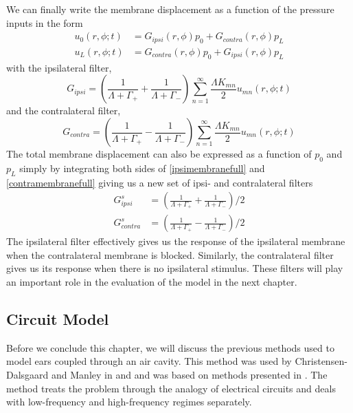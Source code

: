 We can finally write the membrane displacement as a function of the pressure inputs in the form
\begin{align}
 u_0(r,\phi;t)&=G_{ipsi}(r,\phi)p_0+G_{contra}(r,\phi)p_L\label{ipsimembranefull}\\
 u_L(r,\phi;t)&=G_{contra}(r,\phi)p_0+G_{ipsi}(r,\phi)p_L\label{contramembranefull}
\end{align}
with the ipsilateral filter,
\begin{equation}
 G_{ipsi}=\left(\frac{1}{\Lambda+\Gamma_+}+\frac{1}{\Lambda+\Gamma_-}\right)\displaystyle\sum^\infty_{n=1}\frac{\Lambda K_{mn}}{2}u_{mn}(r,\phi;t)
\end{equation}
and the contralateral filter,
\begin{equation}
 G_{contra}=\left(\frac{1}{\Lambda+\Gamma_+}-\frac{1}{\Lambda+\Gamma_-}\right)\displaystyle\sum^\infty_{n=1}\frac{\Lambda K_{mn}}{2}u_{mn}(r,\phi;t)
\end{equation}
The total membrane displacement can also be expressed as a function of $p_0$ and $p_L$ simply by integrating both sides of \eqref{ipsimembranefull}
and \eqref{contramembranefull} giving us a new set of ipsi- and contralateral filters
\begin{align}
 G^s_{ipsi}&=\left(\frac{1}{\Lambda+\Gamma_+}+\frac{1}{\Lambda+\Gamma_-}\right)/2 \label{ipsimembranetotal}\\
 G^s_{contra}&=\left(\frac{1}{\Lambda+\Gamma_+}-\frac{1}{\Lambda+\Gamma_-}\right)/2 \label{contramembranetotal}
\end{align}
The ipsilateral filter effectively gives us the response of the ipsilateral membrane when the contralateral membrane
is blocked. Similarly, the contralateral filter gives us its response when there is no ipsilateral stimulus. These filters
will play an important role in the evaluation of the model in the next chapter.

\subsection{Circuit Model}
Before we conclude this chapter, we will discuss the previous methods used to model ears coupled through
an air cavity. This method was used by Christensen-Dalsgaard and Manley in \cite{dalsgaardmanley1} and \cite{dalsgaardmanley2}
and was based on methods presented in \cite{fletcheracoustic}. The method treats the problem through the analogy of electrical circuits
and deals with low-frequency and high-frequency regimes separately.

